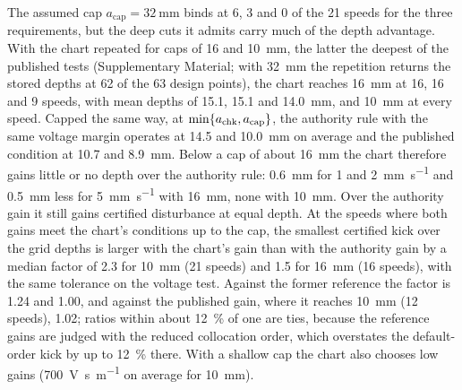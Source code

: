 
The assumed cap $a_{\mathrm{cap}}=\SI{32}{\milli\metre}$ binds at 6, 3 and 0 of the 21 speeds for the three requirements, but the deep cuts it admits carry much of the depth advantage. With the chart repeated for caps of 16 and \SI{10}{\milli\metre}, the latter the deepest of the published tests (Supplementary Material; with \SI{32}{\milli\metre} the repetition returns the stored depths at 62 of the 63 design points), the chart reaches \SI{16}{\milli\metre} at 16, 16 and 9 speeds, with mean depths of 15.1, 15.1 and \SI{14.0}{\milli\metre}, and \SI{10}{\milli\metre} at every speed. Capped the same way, at $\min\{a_{\mathrm{chk}},a_{\mathrm{cap}}\}$, the authority rule with the same voltage margin operates at 14.5 and \SI{10.0}{\milli\metre} on average and the published condition at 10.7 and \SI{8.9}{\milli\metre}. Below a cap of about \SI{16}{\milli\metre} the chart therefore gains little or no depth over the authority rule: \SI{0.6}{\milli\metre} for 1 and \SI{2}{\milli\metre\per\second} and \SI{0.5}{\milli\metre} less for \SI{5}{\milli\metre\per\second} with \SI{16}{\milli\metre}, none with \SI{10}{\milli\metre}. Over the authority gain it still gains certified disturbance at equal depth. At the speeds where both gains meet the chart's conditions up to the cap, the smallest certified kick over the grid depths is larger with the chart's gain than with the authority gain by a median factor of 2.3 for \SI{10}{\milli\metre} (21 speeds) and 1.5 for \SI{16}{\milli\metre} (16 speeds), with the same tolerance on the voltage test. Against the former reference the factor is 1.24 and 1.00, and against the published gain, where it reaches \SI{10}{\milli\metre} (12 speeds), 1.02; ratios within about \SI{12}{\percent} of one are ties, because the reference gains are judged with the reduced collocation order, which overstates the default-order kick by up to \SI{12}{\percent} there. With a shallow cap the chart also chooses low gains (\SI{700}{\volt\second\per\metre} on average for \SI{10}{\milli\metre}).
